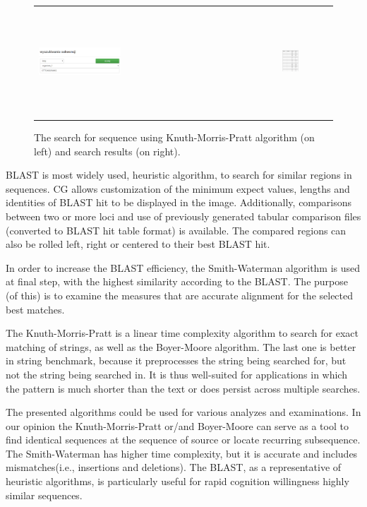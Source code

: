 \documentclass[a4paper]{spie}
\newcommand{\appShortcut}{CG}
\begin{document}
\begin{figure}[htp]
  \centering
  \begin{tabular}{ll}
    \includegraphics[width=0.35\textwidth]{img/search.png}
    &
    \includegraphics[width=0.35\textwidth, height=4cm]{img/search_results.png}
  \end{tabular}
  \caption{The search for sequence using Knuth-Morris-Pratt algorithm (on left) and search results (on right).}
  \label{fig:search}
\end{figure}

BLAST is most widely used, heuristic algorithm, to search for similar regions in sequences.
\appShortcut{} allows customization of the minimum expect values, lengths and identities of BLAST hit to be displayed in the image.
Additionally, comparisons between two or more loci and use of previously generated tabular comparison files (converted to BLAST hit table format) is available.
The compared regions can also be rolled left, right or centered to their best BLAST hit.

In order to increase the BLAST efficiency, the Smith-Waterman algorithm is used at final step, with the highest similarity according to the BLAST.
The purpose (of this) is to examine the measures that are accurate alignment for the selected best matches.

The Knuth-Morris-Pratt is a linear time complexity algorithm to search for exact matching of strings, as well as the Boyer-Moore algorithm.
The last one is better in string benchmark, because it preprocesses the string being searched for, but not the string being searched in.
It is thus well-suited for applications in which the pattern is much shorter than the text or does persist across multiple searches.

The presented algorithms could be used for various analyzes and examinations.
In our opinion the Knuth-Morris-Pratt or/and Boyer-Moore can serve as a tool to find identical sequences
at the sequence of source or locate recurring subsequence.
The Smith-Waterman has higher time complexity, but it is accurate and includes mismatches(i.e., insertions and deletions).
The BLAST, as a representative of heuristic algorithms, is particularly useful for rapid cognition willingness highly similar sequences.
\end{document}
